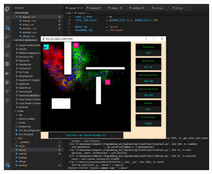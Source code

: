 \documentclass[]{article}
\begin{document}
\begin{figure}[htbp]
	\centering
	\includegraphics[width=0.9\linewidth]{../record4}
	\label{fig:record4}
\end{figure}

\clearpage
\end{document}
